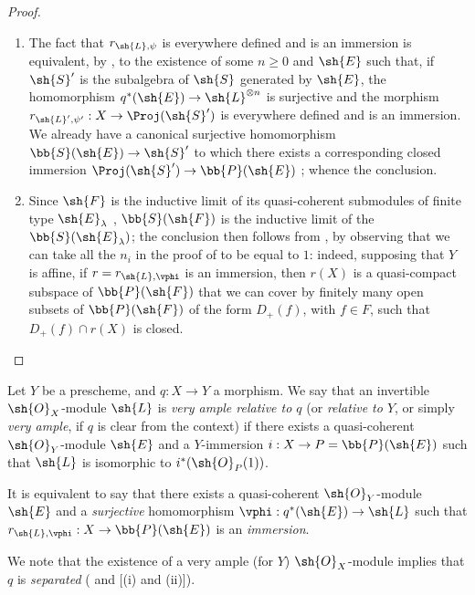 \begin{proof}
\medskip\noindent
\begin{enumerate}
  \item[\rm{(i)}] The fact that $r_{\sh{L},\psi}$ is everywhere defined and is an immersion is equivalent, by , to the existence of some $n\geq0$ and $\sh{E}$ such that, if $\sh{S}'$ is the subalgebra of $\sh{S}$ generated by $\sh{E}$, the homomorphism $q^*(\sh{E})\to\sh{L}^{\otimes n}$ is surjective and the morphism $r_{\sh{L}',\psi'}:X\to\Proj(\sh{S}')$ is everywhere defined and is an immersion.
    We already have a canonical surjective homomorphism $\bb{S}(\sh{E})\to\sh{S}'$ to which there exists a corresponding closed immersion $\Proj(\sh{S}')\to\bb{P}(\sh{E})$ ;
    whence the conclusion.
  \item[\rm{(ii)}] Since $\sh{F}$ is the inductive limit of its quasi-coherent submodules of finite type $\sh{E}_\lambda$ , $\bb{S}(\sh{F})$ is the inductive limit of the $\bb{S}(\sh{E}_\lambda)$;
    the conclusion then follows from , by observing that we can take all the $n_i$ in the proof of  to be equal to $1$:
    indeed, supposing that $Y$ is affine, if $r=r_{\sh{L},\vphi}$ is an immersion, then $r(X)$ is a quasi-compact subspace of $\bb{P}(\sh{F})$ that we can cover by finitely many open subsets of $\bb{P}(\sh{F})$ of the form $D_+(f)$, with $f\in F$, such that $D_+(f)\cap r(X)$ is closed.
\end{enumerate}
\end{proof}

\begin{definition}[4.4.2]
\label{II.4.4.2}
Let $Y$ be a prescheme, and $q:X\to Y$ a morphism.
We say that an invertible $\sh{O}_X$-module $\sh{L}$ is \emph{very ample relative to $q$} (or \emph{relative to $Y$}, or simply \emph{very ample}, if $q$ is clear from the context) if there exists a quasi-coherent $\sh{O}_Y$-module $\sh{E}$ and a $Y$-immersion $i:X\to P=\bb{P}(\sh{E})$ such that $\sh{L}$ is isomorphic to $i^*(\sh{O}_P(1))$.
\end{definition}

It is equivalent  to say that there exists a quasi-coherent $\sh{O}_Y$-module $\sh{E}$ and a \emph{surjective} homomorphism $\vphi:q^*(\sh{E})\to\sh{L}$ such that $r_{\sh{L},\vphi}:X\to\bb{P}(\sh{E})$ is an \emph{immersion}.

We note that the existence of a very ample (for $Y$) $\sh{O}_X$-module implies that $q$ is \emph{separated} ( and [(i) and (ii)]).

